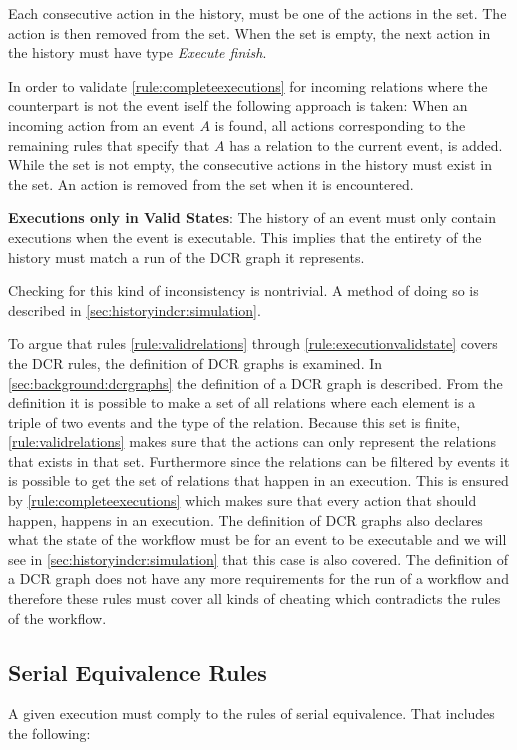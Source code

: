 	Each consecutive action in the history, must be one of the actions in the set. The action is then removed from the set. When the set is empty, the next action in the history must have type \textit{Execute finish}.
	
	\newpar In order to validate \autoref{rule:completeexecutions} for incoming relations where the counterpart is not the event iself the following approach is taken: When an incoming action from an event $A$ is found, all actions corresponding to the remaining rules that specify that $A$ has a relation to the current event, is added. While the set is not empty, the consecutive actions in the history must exist in the set. An action is removed from the set when it is encountered.

	\begin{ruledef}
		\textbf{Executions only in Valid States}: The history of an event must only contain executions when the event is executable. This implies that the entirety of the history must match a run of the DCR graph it represents.
		\label{rule:executionvalidstate}
	\end{ruledef}
	
	\noindent Checking for this kind of inconsistency is nontrivial. A method of doing so is described in \autoref{sec:historyindcr:simulation}.
	
	To argue that rules \ref{rule:validrelations} through \ref{rule:executionvalidstate} covers the DCR rules, the definition of DCR graphs is examined. In \autoref{sec:background:dcrgraphs} the definition of a DCR graph is described. From the definition it is possible to make a set of all relations where each element is a triple of two events and the type of the relation. Because this set is finite, \autoref{rule:validrelations} makes sure that the actions can only represent the relations that exists in that set. Furthermore since the relations can be filtered by events it is possible to get the set of relations that happen in an execution. This is ensured by \autoref{rule:completeexecutions} which makes sure that every action that should happen, happens in an execution. The definition of DCR graphs also declares what the state of the workflow must be for an event to be executable and we will see in \autoref{sec:historyindcr:simulation} that this case is also covered. The definition of a DCR graph does not have any more requirements for the run of a workflow and therefore these rules must cover all kinds of cheating which contradicts the rules of the workflow.
	
	\subsection{Serial Equivalence Rules}
	A given execution must comply to the rules of serial equivalence. That includes the following:
	
